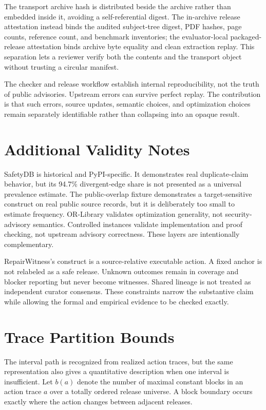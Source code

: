 \documentclass[10pt,conference]{IEEEtran}
\begin{document}
The transport archive hash is distributed beside the archive rather than embedded inside it, avoiding a self-referential digest. The in-archive release attestation instead binds the audited subject-tree digest, PDF hashes, page counts, reference count, and benchmark inventories; the evaluator-local packaged-release attestation binds archive byte equality and clean extraction replay. This separation lets a reviewer verify both the contents and the transport object without trusting a circular manifest.

The checker and release workflow establish internal reproducibility, not the truth of public advisories. Upstream errors can survive perfect replay. The contribution is that such errors, source updates, semantic choices, and optimization choices remain separately identifiable rather than collapsing into an opaque result.

\section{Additional Validity Notes}
SafetyDB is historical and PyPI-specific. It demonstrates real duplicate-claim behavior, but its 94.7\% divergent-edge share is not presented as a universal prevalence estimate. The public-overlap fixture demonstrates a target-sensitive construct on real public source records, but it is deliberately too small to estimate frequency. OR-Library validates optimization generality, not security-advisory semantics. Controlled instances validate implementation and proof checking, not upstream advisory correctness. These layers are intentionally complementary.

RepairWitness's construct is a source-relative executable action. A fixed anchor is not relabeled as a safe release. Unknown outcomes remain in coverage and blocker reporting but never become witnesses. Shared lineage is not treated as independent curator consensus. These constraints narrow the substantive claim while allowing the formal and empirical evidence to be checked exactly.

\section{Trace Partition Bounds}
The interval path is recognized from realized action traces, but the same representation also gives a quantitative description when one interval is insufficient. Let $b(a)$ denote the number of maximal constant blocks in an action trace $a$ over a totally ordered release universe. A block boundary occurs exactly where the action changes between adjacent releases.
\end{document}
